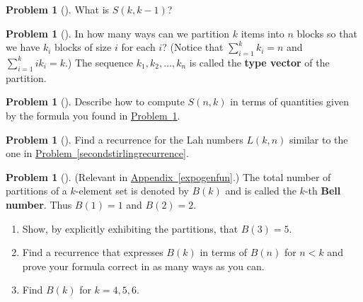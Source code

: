 \documentclass[10pt,]{book}
\newcommand{\terminology}[1]{\textbf{#1}}
\theoremstyle{plain}
\theoremstyle{definition}
\newtheorem{activity}[project]{Problem}
\theoremstyle{definition}
\numberwithin{equation}{chapter}
\newcommand{\importantarrow}{\Rightarrow}
\newcommand{\lt}{<}
\begin{document}
\begin{activity}[] \label{activity-138}
What is \(S(k,k-1)\)?%
\end{activity}
\begin{activity}[] \label{partitionsgivenpartsize}
In how many ways can we partition \(k\) items into \(n\) blocks so that we have \(k_i\) blocks of size \(i\) for each \(i\)? (Notice that \(\sum_{i=1}^k k_i = n\) and \(\sum_{i=1}^k ik_i = k\).) The sequence \(k_1,k_2,\ldots,k_n\) is called the \terminology{type vector} of the partition.%
\end{activity}
\begin{activity}[] \label{activity-140}
Describe how to compute \(S(n,k)\) in terms of quantities given by the formula you found in \hyperref[partitionsgivenpartsize]{Problem~\ref{partitionsgivenpartsize}}.%
\end{activity}
\begin{activity}[]\marginsymbol[-1em]{\pdftooltip{$\importantarrow$}{especially interesting}} \label{activity-141}
Find a recurrence for the Lah numbers \(L(k,n)\) similar to the one in \hyperref[secondstirlingrecurrence]{Problem~\ref{secondstirlingrecurrence}}.%
\end{activity}
\begin{activity}[] \label{BellNumberIntro}
(Relevant in \hyperref[expogenfun]{Appendix~\ref{expogenfun}}.) The total number of partitions of a \(k\)-element set is denoted by \(B(k)\) and is called the \(k\)-th \terminology{Bell number}. Thus \(B(1)=1\) and \(B(2) =2\).%
\begin{enumerate}[font=\bfseries,label=(\alph*),ref=\alph*]
\item\label{task-108} \marginsymbol[-2.5em]{} Show, by explicitly exhibiting the partitions, that \(B(3)=5\).%
\item\label{task-109} \marginsymbol[-2.5em]{} Find a recurrence that expresses \(B(k)\) in terms of \(B(n)\) for \(n\lt  k\) and prove your formula correct in as many ways as you can.%
\item\label{task-110} \marginsymbol[-2.5em]{} Find \(B(k)\) for \(k=4,5,6\).%
\end{enumerate}
\end{activity}
\typeout{************************************************}
\typeout{************************************************}
\end{document}
